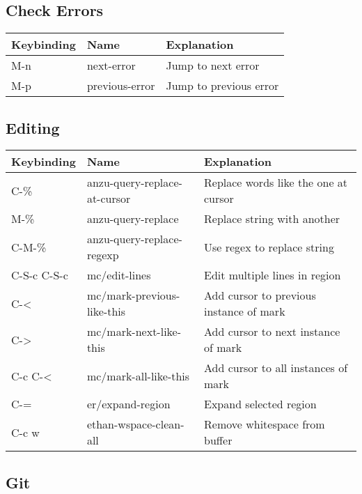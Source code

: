 \documentclass[11pt]{article}
\begin{document}
\subsection{Check Errors}
\label{sec:orgheadline3}

\begin{center}
\begin{tabular}{lll}
Keybinding & Name & Explanation\\
\hline
M-n & next-error & Jump to next error\\
M-p & previous-error & Jump to previous error\\
\end{tabular}
\end{center}

\subsection{Editing}
\label{sec:orgheadline4}
\begin{center}
\begin{tabular}{lll}
Keybinding & Name & Explanation\\
\hline
C-\% & anzu-query-replace-at-cursor & Replace words like the one at cursor\\
M-\% & anzu-query-replace & Replace string with another\\
C-M-\% & anzu-query-replace-regexp & Use regex to replace string\\
C-S-c C-S-c & mc/edit-lines & Edit multiple lines in region\\
C-< & mc/mark-previous-like-this & Add cursor to previous instance of mark\\
C-> & mc/mark-next-like-this & Add cursor to next instance of mark\\
C-c C-< & mc/mark-all-like-this & Add cursor to all instances of mark\\
C-= & er/expand-region & Expand selected region\\
C-c w & ethan-wspace-clean-all & Remove whitespace from buffer\\
\end{tabular}
\end{center}

\subsection{Git}
\label{sec:orgheadline5}
\end{document}
